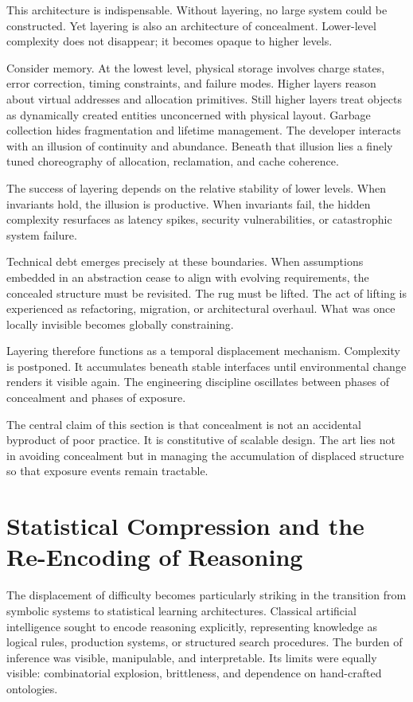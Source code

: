 \documentclass[11pt]{article}
\begin{document}
This architecture is indispensable. Without layering, no large system could be constructed. Yet layering is also an architecture of concealment. Lower-level complexity does not disappear; it becomes opaque to higher levels.

Consider memory. At the lowest level, physical storage involves charge states, error correction, timing constraints, and failure modes. Higher layers reason about virtual addresses and allocation primitives. Still higher layers treat objects as dynamically created entities unconcerned with physical layout. Garbage collection hides fragmentation and lifetime management. The developer interacts with an illusion of continuity and abundance. Beneath that illusion lies a finely tuned choreography of allocation, reclamation, and cache coherence.

The success of layering depends on the relative stability of lower levels. When invariants hold, the illusion is productive. When invariants fail, the hidden complexity resurfaces as latency spikes, security vulnerabilities, or catastrophic system failure.

Technical debt emerges precisely at these boundaries. When assumptions embedded in an abstraction cease to align with evolving requirements, the concealed structure must be revisited. The rug must be lifted. The act of lifting is experienced as refactoring, migration, or architectural overhaul. What was once locally invisible becomes globally constraining.

Layering therefore functions as a temporal displacement mechanism. Complexity is postponed. It accumulates beneath stable interfaces until environmental change renders it visible again. The engineering discipline oscillates between phases of concealment and phases of exposure.

The central claim of this section is that concealment is not an accidental byproduct of poor practice. It is constitutive of scalable design. The art lies not in avoiding concealment but in managing the accumulation of displaced structure so that exposure events remain tractable.

\section{Statistical Compression and the Re-Encoding of Reasoning}

The displacement of difficulty becomes particularly striking in the transition from symbolic systems to statistical learning architectures. Classical artificial intelligence sought to encode reasoning explicitly, representing knowledge as logical rules, production systems, or structured search procedures. The burden of inference was visible, manipulable, and interpretable. Its limits were equally visible: combinatorial explosion, brittleness, and dependence on hand-crafted ontologies.
\end{document}
